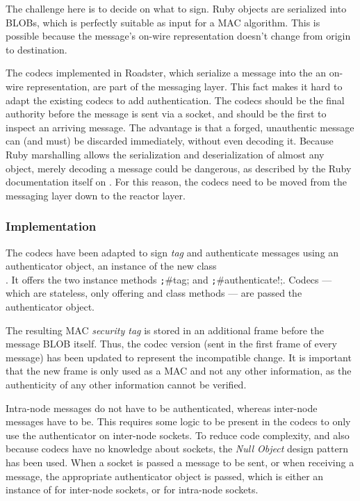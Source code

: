 The challenge here is to decide on what to sign. Ruby objects are serialized
into \glspl{BLOB}, which is perfectly suitable as input for a \gls{MAC} algorithm.
This is possible because the message's on-wire
representation doesn't change from origin to destination.

The codecs implemented in Roadster, which serialize a message into the an
on-wire representation, are part of the messaging layer. This fact makes it
hard to adapt the existing codecs to add authentication. The codecs should be
the final authority before the message is sent via a socket, and should be the
first to inspect an arriving message. The advantage is that a forged,
unauthentic message can (and must) be discarded immediately, without even
decoding it.  Because Ruby marshalling allows the serialization and
deserialization of almost any object, merely decoding a message could be
dangerous, as described by the Ruby documentation itself on \cite[Security
considerations]{rb:doc:marshal}.  For this reason, the codecs need to be moved
from the messaging layer down to the reactor layer.


\subsubsection{Implementation}
The codecs have been adapted to sign \emph{tag} and authenticate messages using
an authenticator object, an instance of the
new class\\. It offers the two
instance methods \texttt;#tag; and \texttt;#authenticate!;.
Codecs --- which are stateless, only offering  and 
class methods --- are passed the authenticator object.

The resulting MAC \emph{security tag} is stored in an additional \zmq frame
before the message BLOB itself. Thus, the codec version (sent in the first
frame of every message) has been updated to represent the incompatible change.
It is important that the new frame is only used as a MAC and not any other
information, as the authenticity of any other information cannot be verified.

Intra-node messages do not have to be authenticated, whereas inter-node
messages have to be. This requires some logic to be present in the codecs
to only use the authenticator on inter-node sockets. To reduce
code complexity, and also because codecs have no knowledge about sockets, the
\emph{Null Object} design pattern has been used. When a socket is passed a
message to be sent, or when receiving a message, the appropriate authenticator
object is passed, which is either an instance of
 for inter-node sockets, or
 for intra-node sockets.


